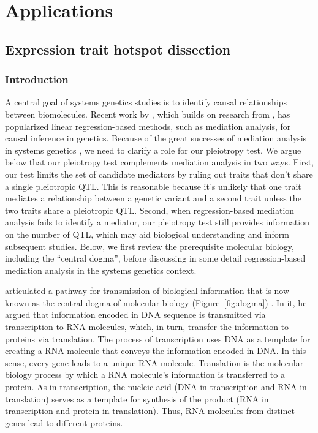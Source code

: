 \documentclass[oneside]{book}\usepackage[]{graphicx}\usepackage[]{color}
\begin{document}
\chapter{Applications}
\section{Expression trait hotspot dissection}
\subsection{Introduction}

A central goal of systems genetics studies is to identify causal relationships between biomolecules. 
Recent work by \citet{chick2016defining}, which builds on research from \citet{baron1986moderator}, has popularized linear regression-based methods, such as mediation analysis, for causal inference in genetics. 
Because of the great successes of mediation analysis in systems genetics \citep{chick2016defining,keller2018genetic}, we need to clarify a role for our pleiotropy test. 
We argue below that our pleiotropy test complements mediation analysis in two ways. 
First, our test limits the set of candidate mediators by ruling out traits that don't share a single pleiotropic QTL. 
This is reasonable because it's unlikely that one trait mediates a relationship between a genetic variant and a second trait unless the two traits share a pleiotropic QTL. 
Second, when regression-based mediation analysis fails to identify a mediator, our pleiotropy test still provides information on the number of QTL, which may aid biological understanding and inform subsequent studies. Below, we first review the prerequisite molecular biology, including the ``central dogma'', before discussing in some detail regression-based mediation analysis in the systems genetics context. 

\citet{crick1958protein} articulated a pathway for transmission of biological information that is now known as the central dogma of molecular biology (Figure~\ref{fig:dogma}) \citep{crick1970central}. 
In it, he argued that information encoded in DNA sequence is transmitted via transcription to 
RNA molecules, which, in turn, transfer the information to proteins via translation. 
The process of transcription uses DNA as a template for creating a RNA molecule that conveys the information encoded in DNA. 
In this sense, every gene leads to a unique RNA molecule. 
Translation is the molecular biology process by which a RNA molecule's information is transferred to a protein. 
As in transcription, the nucleic acid (DNA in transcription and RNA in translation) serves as a template for synthesis of the product (RNA in transcription and protein in translation). 
Thus, RNA molecules from distinct genes lead to different proteins.
\end{document}
